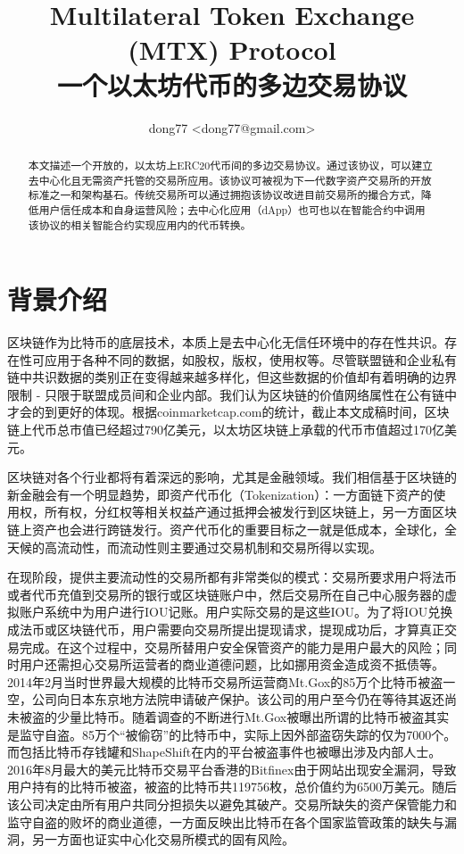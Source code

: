 \documentclass[UTF8,nofonts]{ctexart}
\title{Multilateral Token Exchange (MTX) Protocol\\一个以太坊代币的多边交易协议}
\author{
    dong77 <dong77@gmail.com>
}
\begin{document}
\maketitle

\begin{abstract}
本文描述一个开放的，以太坊上ERC20代币间的多边交易协议。通过该协议，可以建立去中心化且无需资产托管的交易所应用。该协议可被视为下一代数字资产交易所的开放标准之一和架构基石。传统交易所可以通过拥抱该协议改进目前交易所的撮合方式，降低用户信任成本和自身运营风险；去中心化应用（dApp）也可也以在智能合约中调用该协议的相关智能合约实现应用内的代币转换。

\end{abstract}

\section{背景介绍\label{sec:background}}

区块链作为比特币的底层技术，本质上是去中心化无信任环境中的存在性共识。存在性可应用于各种不同的数据，如股权，版权，使用权等。尽管联盟链和企业私有链中共识数据的类别正在变得越来越多样化，但这些数据的价值却有着明确的边界限制 - 只限于联盟成员间和企业内部。我们认为区块链的价值网络属性在公有链中才会的到更好的体现。根据coinmarketcap.com的统计，截止本文成稿时间，区块链上代币总市值已经超过790亿美元，以太坊区块链上承载的代币市值超过170亿美元。

区块链对各个行业都将有着深远的影响，尤其是金融领域。我们相信基于区块链的新金融会有一个明显趋势，即资产代币化（Tokenization）：一方面链下资产的使用权，所有权，分红权等相关权益产通过抵押会被发行到区块链上，另一方面区块链上资产也会进行跨链发行。资产代币化的重要目标之一就是低成本，全球化，全天候的高流动性，而流动性则主要通过交易机制和交易所得以实现。

在现阶段，提供主要流动性的交易所都有非常类似的模式：交易所要求用户将法币或者代币充值到交易所的银行或区块链账户中，然后交易所在自己中心服务器的虚拟账户系统中为用户进行IOU记账。用户实际交易的是这些IOU。为了将IOU兑换成法币或区块链代币，用户需要向交易所提出提现请求，提现成功后，才算真正交易完成。在这个过程中，交易所替用户安全保管资产的能力是用户最大的风险；同时用户还需担心交易所运营者的商业道德问题，比如挪用资金造成资不抵债等。2014年2月当时世界最大规模的比特币交易所运营商Mt.Gox的85万个比特币被盗一空，公司向日本东京地方法院申请破产保护。该公司的用户至今仍在等待其返还尚未被盗的少量比特币。随着调查的不断进行Mt.Gox被曝出所谓的比特币被盗其实是监守自盗。85万个“被偷窃”的比特币中，实际上因外部盗窃失踪的仅为7000个。而包括比特币存钱罐和ShapeShift在内的平台被盗事件也被曝出涉及内部人士。2016年8月最大的美元比特币交易平台香港的Bitfinex由于网站出现安全漏洞，导致用户持有的比特币被盗，被盗的比特币共119756枚，总价值约为6500万美元。随后该公司决定由所有用户共同分担损失以避免其破产。交易所缺失的资产保管能力和监守自盗的败坏的商业道德，一方面反映出比特币在各个国家监管政策的缺失与漏洞，另一方面也证实中心化交易所模式的固有风险。
\end{document}

